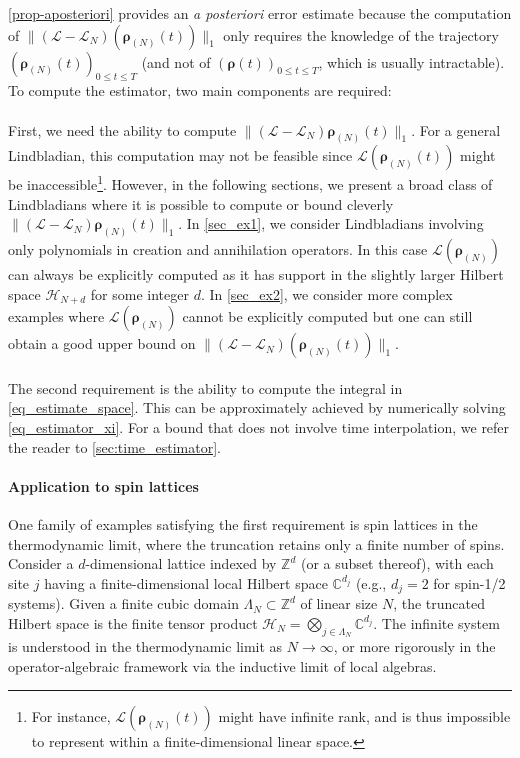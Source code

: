 \documentclass[a4paper,onecolumn,amsmath,amssymb,amsfonts,accepted=2026-03-06]{quantumarticle}
\newcommand{\xL}{\mathcal{L}}
\newcommand{\xH}{\mathcal{H}}
\newcommand{\rN}{{\boldsymbol{\rho}_{(N)}}}
\begin{document}
\cref{prop-aposteriori} provides an \textit{a posteriori} error estimate because the computation of $\|(\xL-\xL_N)(\rN(t))\|_1$ only requires the knowledge of the trajectory $(\rN(t))_{0 \leq t \leq T}$ (and not of $(\boldsymbol{\rho}(t))_{0 \leq t \leq T}$, which is usually intractable). To compute the estimator, two main components are required:


\paragraph{}First, we need the ability to compute $\|\left(\xL-\xL_N\right) \rN(t)\|_1$. For a general Lindbladian, this computation may not be feasible since $\xL(\rN(t))$ might be inaccessible\footnote{For instance, \(\xL(\rN(t))\) might have infinite rank, and is thus impossible to represent within a finite-dimensional linear space.}. However, in the following sections, we present a broad class of Lindbladians where it is possible to compute or bound cleverly \(\|\left(\xL - \xL_N\right) \rN(t)\|_1\). In \cref{sec_ex1}, we consider Lindbladians involving only polynomials in creation and annihilation operators. In this case $\xL(\rN)$ can always be explicitly computed as it has support in the slightly larger Hilbert space $\xH_{N+d}$ for some integer $d$. In \cref{sec_ex2}, we consider more complex examples where $\xL(\rN)$ cannot be explicitly computed but one can still obtain a good upper bound on $\|(\xL-\xL_N)(\rN(t))\|_1$.

\paragraph{}The second requirement is the ability to compute the integral in \cref{eq_estimate_space}. This can be approximately achieved by numerically solving \cref{eq_estimator_xi}. For a bound that does not involve time interpolation, we refer the reader to \cref{sec:time_estimator}.

\paragraph{Application to spin lattices}
One family of examples satisfying the first requirement is spin lattices in the thermodynamic limit, where the truncation retains only a finite number of spins. Consider a $d$-dimensional lattice indexed by $\mathbb{Z}^d$ (or a subset thereof), with each site $j$ having a finite-dimensional local Hilbert space $\mathbb{C}^{d_j}$ (e.g., $d_j = 2$ for spin-1/2 systems). Given a finite cubic domain $\Lambda_N \subset \mathbb{Z}^d$ of linear size $N$, the truncated Hilbert space is the finite tensor product $\xH_N = \bigotimes_{j \in \Lambda_N} \mathbb{C}^{d_j}$. The infinite system is understood in the thermodynamic limit as $N\to\infty$, or more rigorously in the operator-algebraic framework via the inductive limit of local algebras.
\end{document}
